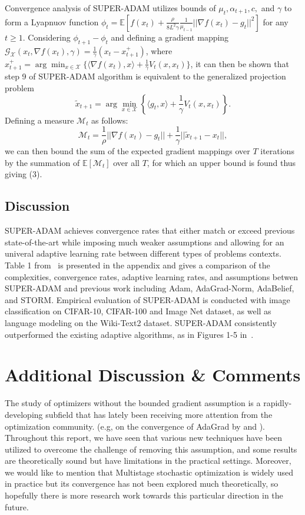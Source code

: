 \documentclass{article}
\begin{document}
Convergence analysis of SUPER-ADAM utilizes bounds of $\mu_t, \alpha_{t+1}, c,$ and $\gamma$ to form a Lyapnuov function $\phi_t = \mathbb{E}[f(x_t) + \frac{\rho}{8L^2 \gamma}\frac{1}{\mu_{t-1}}||\nabla f(x_t) - g_t||^2]$ for any $t\geq 1$. Considering
$\phi_{t+1} - \phi_t$ and defining a gradient mapping $\mathcal{G}_{\mathcal{X}}(x_t, \nabla f(x_t),\gamma) = \frac{1}{\gamma}(x_t - x^+_{t+1})$, where $x^+_{t+1} = \arg\min_{x\in\mathcal{X}}\{\langle\nabla f(x_t), x\rangle + \frac{1}{\gamma} V_t(x,x_t)\}$,
it can then be shown that step 9 of SUPER-ADAM algorithm is equivalent to the generalized projection problem
\begin{equation}
	\tilde{x}_{t+1} = \arg\min_{x\in\mathcal{X}}\left\{\langle g_t, x\rangle + \frac{1}{\gamma}V_t (x,x_t)\right\}.
\end{equation}
Defining a measure $\mathcal{M}_t$ as follows:
\begin{equation}
	\mathcal{M}_t = \frac{1}{\rho}||\nabla f(x_t) - g_t|| + \frac{1}{\gamma}||\tilde{x}_{t+1} - x_t||,
\end{equation}
we can then bound the sum of the expected gradient mappings over $T$ iterations by the summation of $\mathbb{E}[\mathcal{M}_t]$ over all $T$, for which an upper bound is found thus giving (3).
\subsection{Discussion}
SUPER-ADAM achieves convergence rates that either match or exceed previous state-of-the-art while imposing much weaker assumptions and allowing for an univeral adaptive learning rate between different types of problems contexts.
Table 1 from~\cite{https://doi.org/10.48550/arxiv.2106.08208} is presented in the appendix and gives a comparison of the complexities, convergence rates, adaptive learning rates, and assumptions betwen SUPER-ADAM and previous work including Adam, AdaGrad-Norm, AdaBelief, and STORM.
Empirical evaluation of SUPER-ADAM is conducted with image classification on CIFAR-10, CIFAR-100 and Image Net dataset, as well as language modeling on the Wiki-Text2 dataset. SUPER-ADAM consistently outperformed the existing adaptive algorithms,
as in Figures 1-5 in~\cite{https://doi.org/10.48550/arxiv.2106.08208}.
\section{Additional Discussion \& Comments}
The study of optimizers without the bounded gradient assumption is a rapidly-developing subfield that has lately been receiving more attention from the optimization community. (e.g, on the convergence of AdaGrad by \cite{jin2022on} and \cite{https://doi.org/10.48550/arxiv.2202.05791}).
Throughout this report, we have seen that various new techniques have been utilized to overcome the challenge of removing this assumption, and some results are theoretically sound but have limitations in the practical settings. Moreover, we would like to mention that Multistage stochastic optimization is widely used in practice but its convergence has not been explored much theoretically, so hopefully there is more research work towards this particular direction in the future.
\newpage

\end{document}
